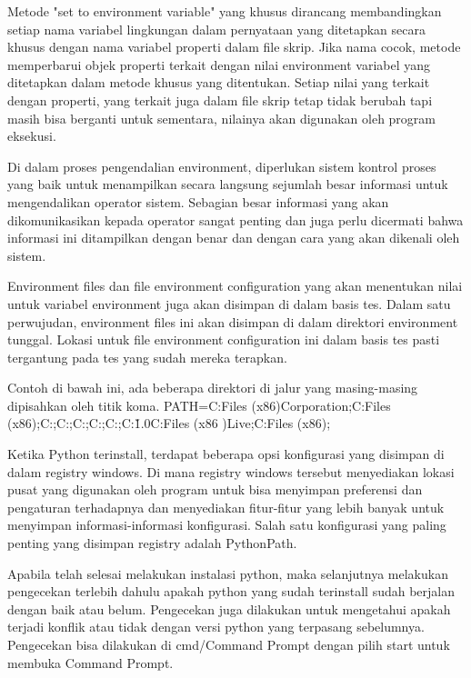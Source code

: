 Metode "set to environment variable" yang khusus dirancang membandingkan setiap nama variabel lingkungan dalam pernyataan yang ditetapkan secara khusus dengan nama variabel properti dalam file skrip. Jika nama cocok, metode memperbarui objek properti terkait dengan nilai environment variabel yang ditetapkan dalam metode khusus yang ditentukan. Setiap nilai yang terkait dengan properti, yang terkait juga dalam file skrip tetap tidak berubah tapi masih bisa berganti untuk sementara, nilainya akan digunakan oleh program eksekusi. \cite{curtis2003overriding}

Di dalam proses pengendalian environment, diperlukan sistem kontrol proses yang baik untuk menampilkan secara langsung sejumlah besar informasi untuk mengendalikan operator sistem. Sebagian besar informasi yang akan dikomunikasikan kepada operator sangat penting dan juga perlu dicermati bahwa informasi ini ditampilkan dengan benar dan dengan cara yang akan dikenali oleh sistem. \cite{kilgore1997directly}

Environment files dan file environment configuration yang akan menentukan nilai untuk variabel environment juga akan disimpan di dalam basis tes. Dalam satu perwujudan, environment files ini akan disimpan di dalam direktori environment tunggal. Lokasi untuk file environment configuration ini dalam basis tes pasti tergantung pada tes yang sudah mereka terapkan. \cite{janniro1997method}

Contoh di bawah ini, ada beberapa direktori di jalur yang masing-masing dipisahkan oleh titik koma.
PATH=C:\Program Files (x86)\NVIDIA Corporation\PhysX\Common;C:\Program Files (x86)\WinSCP;C:\Perl\site\bin;C:\Perl\bin;C:\WINDOWS{};C:\WINDOWS;C:\WINDOWS {}\Wbem;C:\WINDOWS{}\WindowsPowerShell\v1.0\;C:\Program Files (x86 )\Windows Live\Shared;C:\Program Files (x86)\FAHClient;

Ketika Python terinstall, terdapat beberapa opsi konfigurasi yang disimpan di dalam registry windows. Di mana registry windows tersebut menyediakan lokasi pusat yang digunakan oleh program untuk bisa menyimpan preferensi dan pengaturan terhadapnya dan menyediakan fitur-fitur yang lebih banyak untuk menyimpan informasi-informasi konfigurasi. Salah satu konfigurasi yang paling penting yang disimpan registry adalah PythonPath.\cite{hammond2000python}

Apabila telah selesai melakukan instalasi python, maka selanjutnya melakukan pengecekan terlebih dahulu apakah python yang sudah terinstall sudah berjalan dengan baik atau belum. Pengecekan juga dilakukan untuk mengetahui apakah terjadi konflik atau tidak dengan versi python yang terpasang sebelumnya. Pengecekan bisa dilakukan di cmd/Command Prompt dengan pilih start untuk membuka Command Prompt. \cite{mckinney2012python}

